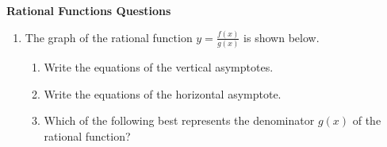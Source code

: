 \documentclass[11pt]{article}
\newcommand{\vasymptote}[2][]{
    \draw [densely dashed,thick, #1] ({rel axis cs:0,0} -| {axis cs:#2,0}) -- ({rel axis cs:0,1} -| {axis cs:#2,0});
}
\begin{document}
\centerline{\textbf{Rational Functions Questions}}

\vspace{.5in}






        
\begin{enumerate} 

\item The graph of the rational function $\displaystyle y=\frac{f(x)}{g(x)}$ is shown below.

\begin{minipage}[t]{0.49\linewidth}
  \end{minipage}
\hfill \vrule \hfill
\begin{minipage}[b]{0.5\linewidth}

\begin{enumerate}
\item Write the equations of the vertical asymptotes.


\item Write the equations of the horizontal asymptote.


\item Which of the following best represents the denominator $g(x)$ of the rational function?


\end{enumerate}
\end{minipage}
\end{enumerate}
\end{document}
